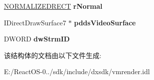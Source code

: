 \begin{DoxyCompactItemize}
\hyperlink{struct___n_o_r_m_a_l_i_z_e_d_r_e_c_t}{N\+O\+R\+M\+A\+L\+I\+Z\+E\+D\+R\+E\+CT} {\bfseries r\+Normal}
\item 
\mbox{\label{struct___v_m_r_v_i_d_e_o_s_t_r_e_a_m_i_n_f_o_accd63e2943f659c22cf79fd3d2e64c06}} 
I\+Direct\+Draw\+Surface7 $\ast$ {\bfseries pdds\+Video\+Surface}
\item 
\mbox{\label{struct___v_m_r_v_i_d_e_o_s_t_r_e_a_m_i_n_f_o_a14ece1d8b9bfad139c882d4ba9f780c5}} 
D\+W\+O\+RD {\bfseries dw\+Strm\+ID}
\end{DoxyCompactItemize}


该结构体的文档由以下文件生成\+:\begin{DoxyCompactItemize}
\item 
E\+:/\+React\+O\+S-\/0../sdk/include/dxsdk/vmrender.\+idl\end{DoxyCompactItemize}
